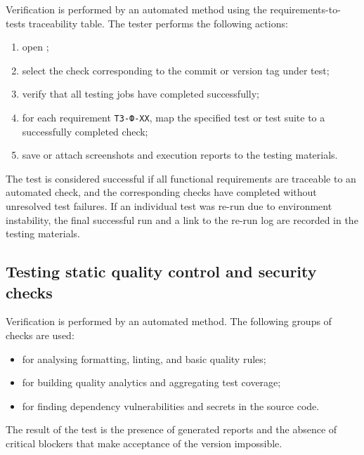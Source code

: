 \documentclass[12pt,a4paper]{extarticle}
\begin{document}
\begin{hseExample}
Verification is performed by an automated method using the requirements-to-tests traceability table. The tester performs the following actions:

\begin{enumerate}[label=\arabic*), leftmargin=1.25cm]
    \item open ;
    \item select the check corresponding to the commit or version tag under test;
    \item verify that all testing jobs have completed successfully;
    \item for each requirement \texttt{ТЗ-Ф-XX}, map the specified test or test suite to a successfully completed check;
    \item save or attach screenshots and execution reports to the testing materials.
\end{enumerate}

The test is considered successful if all functional requirements are traceable to an automated check, and the corresponding checks have completed without unresolved test failures. If an individual test was re-run due to environment instability, the final successful run and a link to the re-run log are recorded in the testing materials.
\end{hseExample}

\subsection{Testing static quality control and security checks}

\begin{hseExample}
Verification is performed by an automated method. The following groups of checks are used:

\begin{itemize}[leftmargin=1.25cm]
    \item {} for analysing formatting, linting, and basic quality rules;
    \item {} for building quality analytics and aggregating test coverage;
    \item {} for finding dependency vulnerabilities and secrets in the source code.
\end{itemize}

The result of the test is the presence of generated reports and the absence of critical blockers that make acceptance of the version impossible.
\end{hseExample}
\end{document}
